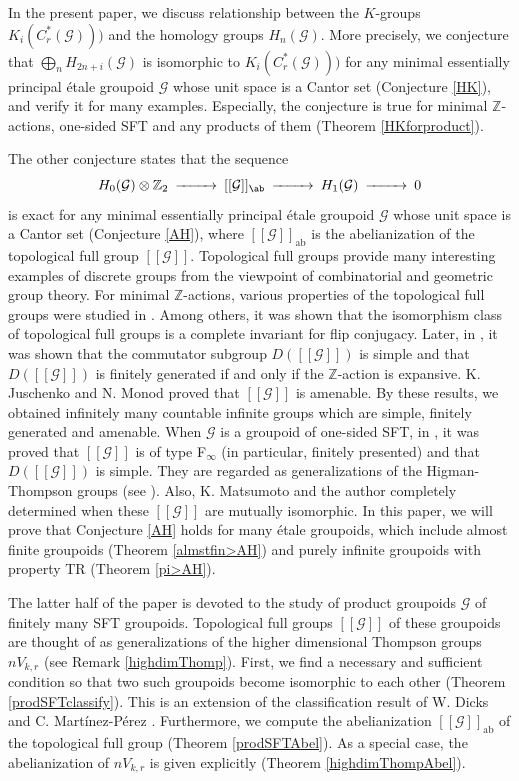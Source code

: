 \documentclass[11pt]{article}
\theoremstyle{definition}
\numberwithin{equation}{section}
\newcommand{\ab}{\mathrm{ab}}
\newcommand{\G}{\mathcal{G}}
\newcommand{\Z}{\mathbb{Z}}
\begin{document}
In the present paper, we discuss relationship 
between the $K$-groups $K_i(C^*_r(\G)))$ and the homology groups $H_n(\G)$. 
More precisely, we conjecture that 
$\bigoplus_nH_{2n+i}(\G)$ is isomorphic to $K_i(C^*_r(\G)))$ 
for any minimal essentially principal \'etale groupoid $\G$ 
whose unit space is a Cantor set (Conjecture \ref{HK}), 
and verify it for many examples. 
Especially, the conjecture is true 
for minimal $\Z$-actions, one-sided SFT and any products of them 
(Theorem \ref{HKforproduct}). 

The other conjecture states that the sequence 
\[
\begin{CD}
H_0(\G)\otimes\Z_2@>>>[[\G]]_\ab@>>>H_1(\G)@>>>0
\end{CD}
\]
is exact for any minimal essentially principal \'etale groupoid $\G$ 
whose unit space is a Cantor set (Conjecture \ref{AH}), 
where $[[\G]]_\ab$ is the abelianization of 
the topological full group $[[\G]]$. 
Topological full groups provide many interesting examples of discrete groups 
from the viewpoint of combinatorial and geometric group theory. 
For minimal $\Z$-actions, 
various properties of the topological full groups were studied 
in \cite{GPS99Israel}. 
Among others, it was shown that 
the isomorphism class of topological full groups is a complete invariant 
for flip conjugacy. 
Later, in \cite{M06IJM}, it was shown that 
the commutator subgroup $D([[\G]])$ is simple 
and that $D([[\G]])$ is finitely generated if and only if 
the $\Z$-action is expansive. 
K. Juschenko and N. Monod \cite{JM13Ann} proved that $[[\G]]$ is amenable. 
By these results, we obtained infinitely many countable infinite groups 
which are simple, finitely generated and amenable. 
When $\G$ is a groupoid of one-sided SFT, in \cite{M15crelle}, 
it was proved that $[[\G]]$ is of type F$_\infty$ 
(in particular, finitely presented) 
and that $D([[\G]])$ is simple. 
They are regarded as generalizations of the Higman-Thompson groups 
(see \cite{Ne04JOP,M15crelle}). 
Also, K. Matsumoto and the author \cite{MM14Kyoto} completely determined 
when these $[[\G]]$ are mutually isomorphic. 
In this paper, we will prove that 
Conjecture \ref{AH} holds for many \'etale groupoids, 
which include almost finite groupoids (Theorem \ref{almstfin>AH}) 
and purely infinite groupoids with property TR (Theorem \ref{pi>AH}). 

The latter half of the paper is devoted to 
the study of product groupoids $\G$ of finitely many SFT groupoids. 
Topological full groups $[[\G]]$ of these groupoids are thought of 
as generalizations of the higher dimensional Thompson groups $nV_{k,r}$ 
(see Remark \ref{highdimThomp}). 
First, we find a necessary and sufficient condition 
so that two such groupoids become isomorphic to each other 
(Theorem \ref{prodSFTclassify}). 
This is an extension of the classification result of 
W. Dicks and C. Mart\'inez-P\'erez \cite{DMP14Israel}. 
Furthermore, 
we compute the abelianization $[[\G]]_\ab$ of the topological full group 
(Theorem \ref{prodSFTAbel}). 
As a special case, the abelianization of $nV_{k,r}$ is given explicitly 
(Theorem \ref{highdimThompAbel}). 
\end{document}
